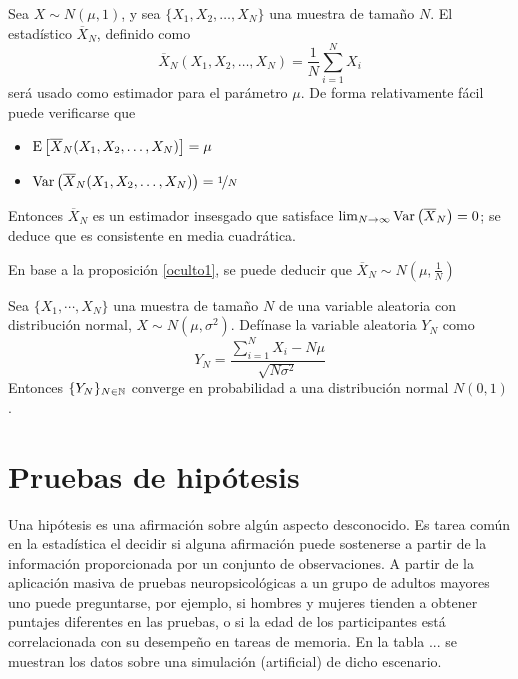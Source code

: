 \begin{ejemplo}
Sea $X\sim N(\mu,1)$, y sea $\{ X_1, X_2, \dots, X_N \}$ una muestra de tamaño $N$. El estadístico $\overline{X}_N$, definido como
\begin{equation}
\overline{X}_N (X_1,X_2,\dots,X_N) = \frac{1}{N} \sum_{i=1}^N X_i
\end{equation}
será usado como estimador para el parámetro $\mu$.
%
De forma relativamente fácil puede verificarse que
\begin{itemize}
\item $\mathrm{E}\left[ \overline{X}_N (X_1,X_2,\dots,X_N) \right] = \mu$
\item $\mathrm{Var}\left( \overline{X}_N (X_1,X_2,\dots,X_N) \right) = \nicefrac{1}{N}$
\end{itemize}

Entonces $\overline{X}_N$ es un estimador insesgado que satisface $\lim_{N\rightarrow\infty} \mathrm{Var}\left( \overline{X}_N \right)=0$; se deduce que es consistente en media cuadrática.

En base a la proposición \ref{oculto1}, se puede deducir que $\overline{X}_N \sim N\left(\mu,\frac{1}{N}\right)$
\end{ejemplo}

\begin{teorema}
Sea $\{ X_1, \cdots, X_N\}$ una muestra de tamaño $N$ de una variable aleatoria con distribución normal, $X\sim N(\mu,\sigma^{2})$. Defínase la variable aleatoria $Y_N$ como
\begin{equation}
Y_N = \frac{\sum_{i=1}^{N}X_i - N \mu}{\sqrt{N \sigma^{2}}}
\end{equation}
Entonces $\{ Y_N \}_{N \in \mathbb{N}}$ converge en probabilidad a una distribución normal $N(0,1)$.
\end{teorema}



\section{Pruebas de hipótesis}


Una hipótesis es una afirmación sobre algún aspecto desconocido.
%
Es tarea común en la estadística el decidir si alguna afirmación puede sostenerse a partir de la
información proporcionada por un conjunto de observaciones. 
%
A partir de la aplicación masiva de pruebas neuropsicológicas a un grupo de adultos mayores uno 
puede preguntarse, por ejemplo, si hombres y mujeres tienden a obtener puntajes diferentes en las
pruebas, o si la edad de los participantes está correlacionada con su desempeño en tareas de 
memoria.
%
En la tabla ... se muestran los datos sobre una simulación (artificial) de dicho escenario.

